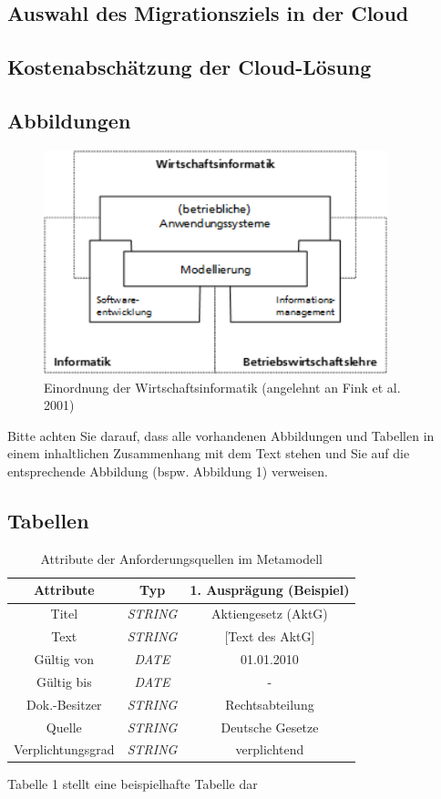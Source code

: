 \subsection{Auswahl des Migrationsziels in der Cloud}
\subsection{Kostenabschätzung der Cloud-Lösung}

\newpage
\subsection{Abbildungen}

\begin{figure}[h]
\begin{center}

\includegraphics[width=10cm]{images/Abb2_3.png}
\caption{Einordnung der Wirtschaftsinformatik (angelehnt an Fink et al. 2001)}
\label{Abbildung2_3}
\end{center}
\end{figure}
Bitte achten Sie darauf, dass alle vorhandenen Abbildungen und Tabellen in einem inhaltlichen Zusammenhang mit dem Text stehen und Sie auf die entsprechende Abbildung (bspw. Abbildung 1) verweisen.
\subsection{Tabellen}
\begin{table}[h]
\centering
\begin{tabular}{ccc}
\hline \textbf{Attribute} &\textbf{Typ}  & \textbf{1. Ausprägung (Beispiel)} \\ 
\hline Titel & \textit{STRING}& Aktiengesetz (AktG)  \\ 
Text& \textit{STRING} &  [Text des AktG]\\ 
Gültig von & \textit{DATE} & 01.01.2010 \\ 
Gültig bis & \textit{DATE} & - \\ 
Dok.-Besitzer & \textit{STRING} & Rechtsabteilung \\ 
Quelle & \textit{STRING}  & Deutsche Gesetze \\ 
Verplichtungsgrad & \textit{STRING} & verplichtend \\ 
\hline 
\end{tabular} 
\caption{Attribute der Anforderungsquellen im Metamodell}
\label{tab:tabelle 1}
\end{table}
\par\medskip

Tabelle 1 stellt eine beispielhafte Tabelle dar